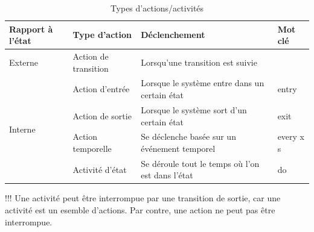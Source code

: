 \begin{table}[H]
\caption{Types d'actions/activités}
\label{tbl:diagram_statechart_typesactions}
\begin{adjustbox}{max width=\textwidth}
\begin{tabular}{p{5em}|p{10em}|l|p{5em}}
\toprule
\textbf{Rapport à l'état}& \textbf{Type d'action} & \textbf{Déclenchement} & \textbf{Mot clé} \\
\midrule
Externe & Action de transition & Lorsqu'une transition est suivie &\\
\cmidrule(lr){1-4}
\multirow{5}{*}{Interne}& Action d'entrée & Lorsque le système entre dans un certain état & entry \\
\cmidrule(lr){2-4}
& Action de sortie & Lorsque le système sort d'un certain état & exit \\
\cmidrule(lr){2-4}
& Action temporelle & Se déclenche basée sur un événement temporel & every x s \\
\cmidrule(lr){2-4}
& Activité d'état & Se déroule tout le temps où l'on est dans l'état & do \\
\bottomrule
\end{tabular}
\end{adjustbox}
\end{table}

!!! Une activité peut être interrompue par une transition de sortie, car une activité est un esemble d'actions. Par contre, une action ne peut pas être interrompue.


